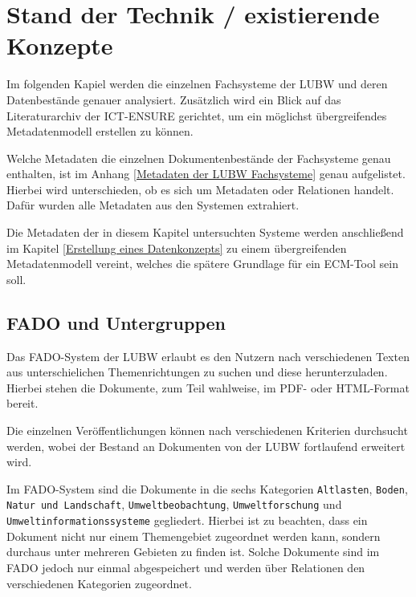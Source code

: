 \section{Stand der Technik / existierende Konzepte} \label{Stand der Technik}
Im folgenden Kapiel werden die einzelnen Fachsysteme der \ac{LUBW} und deren Datenbest\"ande genauer analysiert. Zus\"atzlich wird ein Blick auf das Literaturarchiv der \ac{ICT-ENSURE} gerichtet, um ein m\"oglichst \"ubergreifendes Metadatenmodell erstellen zu k\"onnen. 

Welche Metadaten die einzelnen Dokumentenbest\"ande der Fachsysteme genau enthalten, ist im Anhang \ref{Metadaten der LUBW Fachsysteme} genau aufgelistet. Hierbei wird unterschieden, ob es sich um Metadaten oder Relationen handelt. Daf\"ur wurden alle Metadaten aus den Systemen extrahiert.


Die Metadaten der in diesem Kapitel untersuchten Systeme werden anschlie\ss{}end im Kapitel \ref{Erstellung eines Datenkonzepts} zu einem \"ubergreifenden Metadatenmodell vereint, welches die sp\"atere Grundlage f\"ur ein \ac{ECM}-Tool sein soll.


\subsection{FADO und Untergruppen} \label{FADO}
Das \ac{FADO}-System der \ac{LUBW} erlaubt es den Nutzern nach verschiedenen Texten aus unterschielichen Themenrichtungen zu suchen und diese herunterzuladen. Hierbei stehen die Dokumente, zum Teil wahlweise, im PDF- oder HTML-Format bereit.

Die einzelnen Ver\"offentlichungen k\"onnen nach verschiedenen Kriterien durchsucht werden, wobei der Bestand an Dokumenten von der \ac{LUBW} fortlaufend erweitert wird.
\cite{LUBW_FADO}

Im \ac{FADO}-System sind die Dokumente in die sechs Kategorien \texttt{Altlasten}, \texttt{Boden}, \texttt{Natur und Landschaft}, \texttt{Umweltbeobachtung}, \texttt{Umweltforschung} und \texttt{Umweltinformationssysteme} gegliedert. Hierbei ist zu beachten, dass ein Dokument nicht nur einem Themengebiet zugeordnet werden kann, sondern durchaus unter mehreren Gebieten zu finden ist. Solche Dokumente sind im \ac{FADO} jedoch nur einmal abgespeichert und werden \"uber Relationen den verschiedenen Kategorien zugeordnet.

